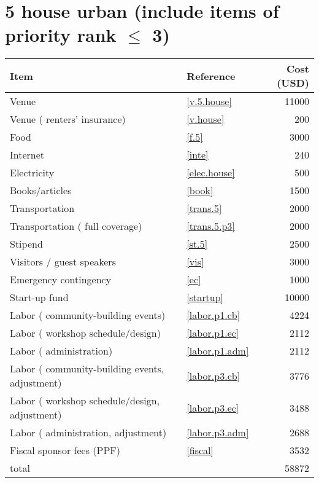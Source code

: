 \section*{5 house urban (include items of priority rank $\leq$ 3)}
\begin{center}
\begin{tabular}{llr}
Item & Reference & Cost (USD) \\ \hline
Venue & \ref{v.5.house} & 11000 \\
Venue ( renters' insurance) & \ref{v.house} & 200 \\
Food & \ref{f.5} & 3000 \\
Internet & \ref{inte} & 240 \\
Electricity & \ref{elec.house} & 500 \\
Books/articles & \ref{book} & 1500 \\
Transportation & \ref{trans.5} & 2000 \\
Transportation ( full coverage) & \ref{trans.5.p3} & 2000 \\
Stipend & \ref{st.5} & 2500 \\
Visitors / guest speakers & \ref{vis} & 3000 \\
Emergency contingency & \ref{ec} & 1000 \\
Start-up fund & \ref{startup} & 10000 \\
Labor ( community-building events) & \ref{labor.p1.cb} & 4224 \\
Labor ( workshop schedule/design) & \ref{labor.p1.ec} & 2112 \\
Labor ( administration) & \ref{labor.p1.adm} & 2112 \\
Labor ( community-building events, adjustment) & \ref{labor.p3.cb} & 3776 \\
Labor ( workshop schedule/design, adjustment) & \ref{labor.p3.ec} & 3488 \\
Labor ( administration, adjustment) & \ref{labor.p3.adm} & 2688 \\
Fiscal sponsor fees (PPF) & \ref{fiscal} & 3532 \\ \hline
total &  & 58872
\end{tabular}
\end{center}
\newpage
